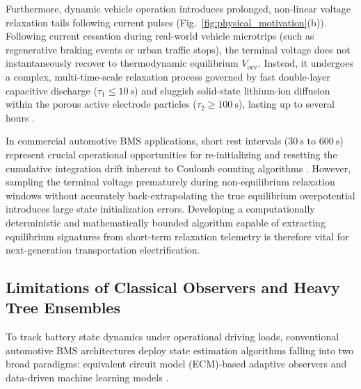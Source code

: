 Furthermore, dynamic vehicle operation introduces prolonged, non-linear voltage relaxation tails following current pulses (Fig.~\ref{fig:physical_motivation}(b)). Following current cessation during real-world vehicle microtrips (such as regenerative braking events or urban traffic stops), the terminal voltage does not instantaneously recover to thermodynamic equilibrium $V_{\text{ocv}}$. Instead, it undergoes a complex, multi-time-scale relaxation process governed by fast double-layer capacitive discharge ($\tau_1 \le 10\ \text{s}$) and sluggish solid-state lithium-ion diffusion within the porous active electrode particles ($\tau_2 \ge 100\ \text{s}$), lasting up to several hours \cite{che2025enhanced, sorouri2025breaking}.

In commercial automotive BMS applications, short rest intervals ($30\ \text{s}$ to $600\ \text{s}$) represent crucial operational opportunities for re-initializing and resetting the cumulative integration drift inherent to Coulomb counting algorithms \cite{waag2014critical, che2025enhanced}. However, sampling the terminal voltage prematurely during non-equilibrium relaxation windows without accurately back-extrapolating the true equilibrium overpotential introduces large state initialization errors. Developing a computationally deterministic and mathematically bounded algorithm capable of extracting equilibrium signatures from short-term relaxation telemetry is therefore vital for next-generation transportation electrification.

\subsection{Limitations of Classical Observers and Heavy Tree Ensembles}
\label{sec:intro_b}

To track battery state dynamics under operational driving loads, conventional automotive BMS architectures deploy state estimation algorithms falling into two broad paradigms: equivalent circuit model (ECM)-based adaptive observers and data-driven machine learning models \cite{masih2018novel, waag2014critical, najafi2024statepower, xu2025state}.

